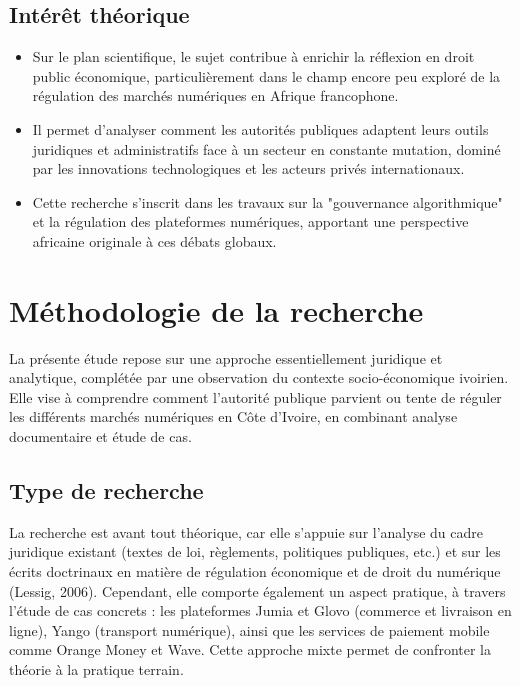 \subsection*{Intérêt théorique}

\begin{itemize}
\item Sur le plan scientifique, le sujet contribue à enrichir la réflexion en droit public économique, particulièrement dans le champ encore peu exploré de la régulation des marchés numériques en Afrique francophone.
\item Il permet d'analyser comment les autorités publiques adaptent leurs outils juridiques et administratifs face à un secteur en constante mutation, dominé par les innovations technologiques et les acteurs privés internationaux.
\item Cette recherche s'inscrit dans les travaux sur la "gouvernance algorithmique" et la régulation des plateformes numériques, apportant une perspective africaine originale à ces débats globaux.
\end{itemize}

\section*{Méthodologie de la recherche}

La présente étude repose sur une approche essentiellement juridique et analytique, complétée par une observation du contexte socio-économique ivoirien. Elle vise à comprendre comment l'autorité publique parvient ou tente de réguler les différents marchés numériques en Côte d'Ivoire, en combinant analyse documentaire et étude de cas.

\subsection*{Type de recherche}

La recherche est avant tout théorique, car elle s'appuie sur l'analyse du cadre juridique existant (textes de loi, règlements, politiques publiques, etc.) et sur les écrits doctrinaux en matière de régulation économique et de droit du numérique (Lessig, 2006). Cependant, elle comporte également un aspect pratique, à travers l'étude de cas concrets : les plateformes Jumia et Glovo (commerce et livraison en ligne), Yango (transport numérique), ainsi que les services de paiement mobile comme Orange Money et Wave. Cette approche mixte permet de confronter la théorie à la pratique terrain.


